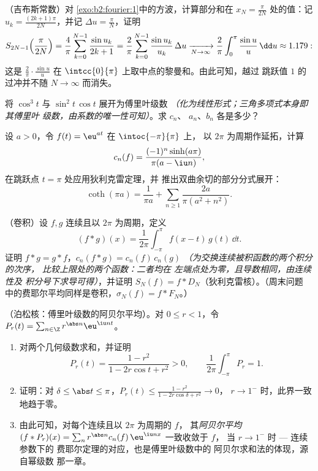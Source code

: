 \begin{exercise}[$\star\star\star$]\label{exo:b2:fourier:8}
（吉布斯常数）对
\cref{exo:b2:fourier:1}中的方波，计算部分和在 $x_N =
\frac{\pi}{2N}$ 处的值：记 $u_k = \frac{(2k+1)\pi}{2N}$，并记 $\Delta u
= \frac{\pi}{N}$，证明
\[
S_{2N-1}\Bigl(\frac{\pi}{2N}\Bigr)
= \frac{4}{\pi}\sum_{k=0}^{N-1} \frac{\sin u_k}{2k+1}
= \frac{2}{\pi}\sum_{k=0}^{N-1} \frac{\sin u_k}{u_k}\,\Delta u
\xrightarrow[N\to\infty]{}
\frac{2}{\pi}\int_0^{\pi}\frac{\sin u}{u}\,\dd u \approx 1.179 :
\]
这是 $\frac{2}{\pi}\cdot\frac{\sin u}{u}$ 在
$\intcc{0}{\pi}$ 上取中点的黎曼和。由此可知，越过
跳跃值 $1$ 的过冲并不随 $N \to \infty$ 而消失。
\end{exercise}

\begin{exercise}[$\star$]\label{exo:b2:fourier:9}
将 $\cos^3 t$ 与 $\sin^2 t\,\cos t$ 展开为傅里叶级数
\emph{（化为线性形式；三角多项式本身即其傅里叶
级数，由系数的唯一性可知）}。求 $c_n$、
$a_n$、$b_n$ 各是多少？
\end{exercise}

\begin{exercise}[$\star\star$]\label{exo:b2:fourier:10}
设 $a > 0$，令 $f(t) = \eu^{at}$ 在 $\intoc{-\pi}{\pi}$ 上，
以 $2\pi$ 为周期作延拓，计算
\[
c_n(f) = \frac{(-1)^n\sinh(a\pi)}{\pi(a - \iu n)} ,
\]
在跳跃点 $t = \pi$ 处应用狄利克雷定理，并
推出双曲余切的部分分式展开：
\[
\coth(\pi a) = \frac{1}{\pi a} + \sum_{n\geq1}
\frac{2a}{\pi(a^2 + n^2)} .
\]
\end{exercise}

\begin{exercise}[$\star\star$]\label{exo:b2:fourier:11}
（卷积）设 $f, g$ 连续且以 $2\pi$ 为周期，定义
\[
(f * g)(x) = \frac{1}{2\pi}\int_{-\pi}^{\pi} f(x - t)\,g(t)\,
\dd t .
\]
证明 $f * g = g * f$，$c_n(f*g) = c_n(f)\,c_n(g)$
\emph{（为交换连续被积函数的两个积分的次序，
比较上限处的两个函数：二者均在
左端点处为零，且导数相同，由连续性及
积分号下求导可得）}，并证明 $S_N(f) =
f * D_N$（狄利克雷核）。（周末问题
中的费耶尔平均同样是卷积，$\sigma_N(f) = f *
F_N$。）
\end{exercise}

\begin{exercise}[$\star\star\star$]\label{exo:b2:fourier:12}
（泊松核：傅里叶级数的阿贝尔平均）。对 $0 \leq r <
1$，令 $P_r(t) = \sum_{n\in\Z} r^{\abs n}\eu^{\iu nt}$。
\begin{enumerate}
  \item 对两个几何级数求和，并证明
        \[
        P_r(t) = \frac{1 - r^2}{1 - 2r\cos t + r^2} > 0,
        \qquad
        \frac{1}{2\pi}\int_{-\pi}^{\pi}P_r = 1 .
        \]
  \item 证明：对 $\delta \leq \abs t \leq \pi$，$P_r(t)
        \leq \frac{1 - r^2}{1 - 2r\cos\delta + r^2} \to 0$，
        $r \to 1^-$ 时，此界一致地趋于零。
  \item 由此可知，对每个连续且以 $2\pi$ 为周期的 $f$，
        其\emph{阿贝尔平均} $(f * P_r)(x) = \sum_n
        r^{\abs n}c_n(f)\,\eu^{\iu nx}$ 一致收敛于 $f$，
        当 $r \to 1^-$ 时 --- 连续参数下的
        费耶尔定理的对应，也是傅里叶级数中的
        阿贝尔求和法的体现，源自幂级数
        那一章。
\end{enumerate}
\end{exercise}

